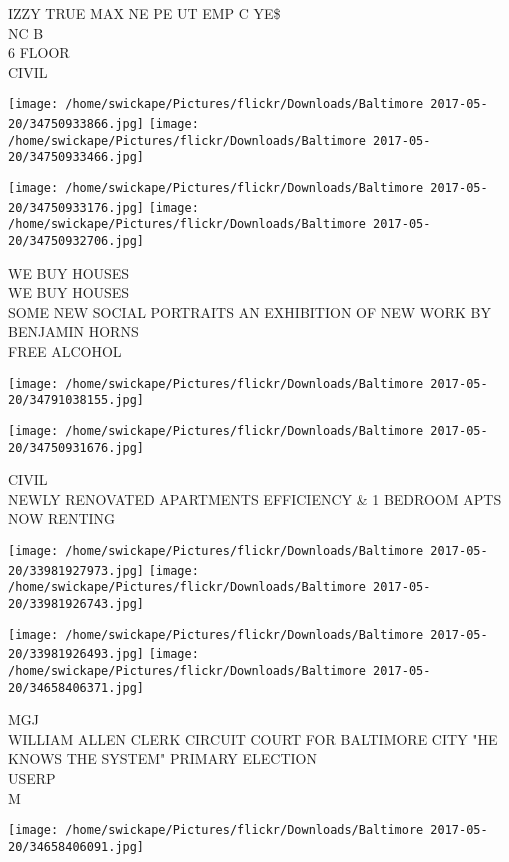 \documentclass[10pt,letterpaper]{article}
\begin{document}
IZZY TRUE MAX NE PE UT EMP C YE\$\\
NC B\\
6 FLOOR\\
CIVIL\\
\pagebreak

\texttt{[image: /home/swickape/Pictures/flickr/Downloads/Baltimore 2017-05-20/34750933866.jpg]}
\texttt{[image: /home/swickape/Pictures/flickr/Downloads/Baltimore 2017-05-20/34750933466.jpg]}

\texttt{[image: /home/swickape/Pictures/flickr/Downloads/Baltimore 2017-05-20/34750933176.jpg]}
\texttt{[image: /home/swickape/Pictures/flickr/Downloads/Baltimore 2017-05-20/34750932706.jpg]}

WE BUY HOUSES\\
WE BUY HOUSES\\
SOME NEW SOCIAL PORTRAITS AN EXHIBITION OF NEW WORK BY BENJAMIN HORNS\\
FREE ALCOHOL\\
\pagebreak

\texttt{[image: /home/swickape/Pictures/flickr/Downloads/Baltimore 2017-05-20/34791038155.jpg]}

\vspace{0.25in}
\texttt{[image: /home/swickape/Pictures/flickr/Downloads/Baltimore 2017-05-20/34750931676.jpg]}

CIVIL\\
NEWLY RENOVATED APARTMENTS EFFICIENCY \& 1 BEDROOM APTS NOW RENTING\\
\pagebreak

\texttt{[image: /home/swickape/Pictures/flickr/Downloads/Baltimore 2017-05-20/33981927973.jpg]}
\texttt{[image: /home/swickape/Pictures/flickr/Downloads/Baltimore 2017-05-20/33981926743.jpg]}

\texttt{[image: /home/swickape/Pictures/flickr/Downloads/Baltimore 2017-05-20/33981926493.jpg]}
\texttt{[image: /home/swickape/Pictures/flickr/Downloads/Baltimore 2017-05-20/34658406371.jpg]}

MGJ\\
WILLIAM ALLEN CLERK CIRCUIT COURT FOR BALTIMORE CITY "HE KNOWS THE SYSTEM" PRIMARY ELECTION\\
USERP\\
M\\
\pagebreak

\texttt{[image: /home/swickape/Pictures/flickr/Downloads/Baltimore 2017-05-20/34658406091.jpg]}
\end{document}
